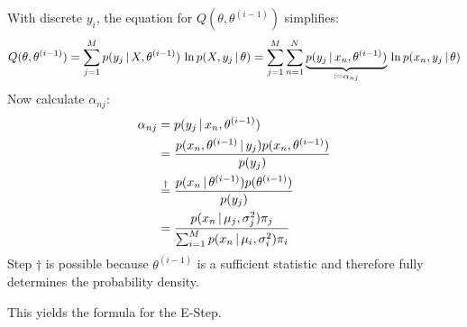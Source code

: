 					With discrete \(y_i\), the equation for \(Q(\theta, \theta^{(i - 1)})\) simplifies:
					\begin{equation}
						Q(\theta, \theta^{(i - 1)}) = \sum_{j = 1}^{M} p(y_j \,\vert\, X, \theta^{(i - 1)}) \, \ln p(X, y_j \,\vert\, \theta) = \sum_{j = 1}^{M} \sum_{n = 1}^{N} \underbrace{p(y_j \,\vert\, x_n, \theta^{(i - 1)})}_{\coloneqq \alpha_{nj}} \, \ln p(x_n, y_j \,\vert\, \theta)
					\end{equation}
					Now calculate \( \alpha_{nj} \):
					\begin{align}
						\alpha_{nj} &= p(y_j \,\vert\, x_n, \theta^{(i - 1)}) \\
							&= \frac{p(x_n, \theta^{(i - 1)} \,\vert\, y_j) p(x_n, \theta^{(i - 1)})}{p(y_j)} \\
							&\overset{\dagger}{=} \frac{p(x_n \,\vert\, \theta^{(i - 1)}) p(\theta^{(i - 1)})}{p(y_j)} \\
							&= \frac{p(x_n \,\vert\, \mu_j, \sigma_j^2) \pi_j}{\sum_{i = 1}^{M} p(x_n \,\vert\, \mu_i, \sigma_i^2) \pi_i}
					\end{align}
					Step \(\dagger\) is possible because \( \theta^{(i - 1)} \) is a sufficient statistic and therefore fully determines the probability density.

					This yields the formula for the E-Step.

